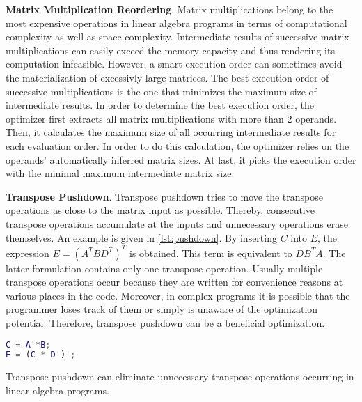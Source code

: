 \textbf{Matrix Multiplication Reordering}. Matrix multiplications belong to the most expensive operations in linear algebra programs in terms of computational complexity as well as space complexity. Intermediate results of successive matrix multiplications can easily exceed the memory capacity and thus rendering its computation infeasible. However, a smart execution order can sometimes avoid the materialization of excessivly large matrices. The best execution order of successive multiplications is the one that minimizes the maximum size of intermediate results.
In order to determine the best execution order, the optimizer first extracts all matrix multiplications with more than $2$ operands.
Then, it calculates the maximum size of all occurring intermediate results for each evaluation order.
In order to do this calculation, the optimizer relies on the operands' automatically inferred matrix sizes.%
At last, it picks the execution order with the minimal maximum intermediate matrix size.


\textbf{Transpose Pushdown}. Transpose pushdown tries to move the transpose operations as close to the matrix input as possible.
Thereby, consecutive transpose operations accumulate at the inputs and unnecessary operations erase themselves.
An example is given in \cref{lst:pushdown}. By inserting $C$ into $E$, the expression $E=(A^T BD^T)^T$ is obtained. This term is equivalent to $DB^T A$. The latter formulation contains only one transpose operation. Usually multiple transpose operations occur because they are written for convenience reasons at various places in the code. Moreover, in complex programs it is possible that the programmer loses track of them or simply is unaware of the optimization potential. Therefore, transpose pushdown can be a beneficial optimization.

\begin{listing}[!h]
  \begin{CenteredBox}
    \begin{lstlisting}[language=Matlab]
C = A'*B;
E = (C * D')';
    \end{lstlisting}
  \end{CenteredBox}
  \caption{Transpose pushdown can eliminate unnecessary transpose operations occurring in linear algebra programs.}
  \label{lst:pushdown}
\end{listing}

